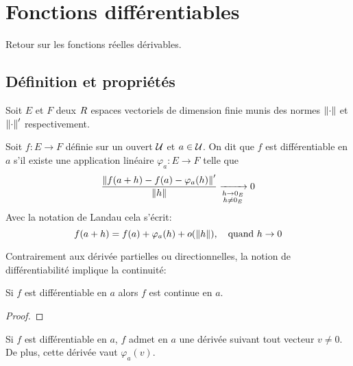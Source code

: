 \sld{\vfill\pagebreak[5]}%
\section{Fonctions différentiables}

\begin{exemple}
    Retour sur les fonctions réelles dérivables.
    \pl{\rep{8cm}}
\end{exemple}

\subsection{Définition et propriétés}

Soit $E$ et $F$ deux $R$ espaces vectoriels de dimension finie munis des normes $\left\lVert\cdot\right\rVert$ et $\left\lVert\cdot\right\rVert'$ respectivement.

\begin{definition}
    [(Différentiabilité en $a$)]
    Soit $f:E \to F$ définie sur un ouvert $\mathcal{U}$ et $a\in\mathcal{U}$. On dit que $f$ est différentiable en $a$ s'il existe une application linéaire $\varphi_a: E \to F$ telle que 
    \[
        \frac{\left\lVert f(a+h) - f(a) - \varphi_a(h)\right\rVert' }{\left\lVert h\right\rVert} \xrightarrow[\substack{h\to 0_E \\ h\neq 0_E}]{} 0
    \]
    Avec la notation de Landau cela s'écrit:
    \[
        f(a+h) = f(a) + \varphi_a(h) + o(\left\lVert h\right\rVert), \quad \text{quand $h\to 0$}
    \]
\end{definition}

\sld{\vfill\pagebreak[5]}%
Contrairement aux dérivée partielles ou directionnelles, la notion de différentiabilité implique la continuité:
\begin{proposition}
    Si $f$ est différentiable en $a$ alors $f$ est continue en $a$.
\end{proposition}
\begin{proof}
    \pl{\rep{5cm}}
\end{proof}

\begin{proposition}
    Si $f$ est différentiable en $a$, $f$ admet en $a$ une dérivée suivant tout vecteur $v \neq 0$. De plus, cette dérivée vaut $\varphi_a(v)$.
\end{proposition}


